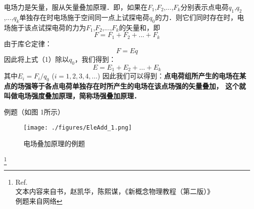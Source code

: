 电场力是矢量，服从矢量叠加原理．即，如果在$F_1$,$F_2$,...,$F_k$分别表示点电荷$q_1$,$q_2$,...,$q_k$单独存在时电场施于空间同一点上试探电荷$q_0$的力．则它们同时存在时，电场施于该点试探电荷的力为$F_1$,$F_2$,...,$F_k$的矢量和，即
\begin{equation}
F = F_1 +F_2 +...+F_k
\end{equation}
由于库仑定律：
\begin{equation}
  F = Eq
\end{equation}
因此将上式（1）除以$q_0$，我们得到： 
\begin{equation}
E = E_1 + E_2 + ... +E_k
\end{equation}
其中$E_i = F_i/q_0$      ($i=1, 2, 3, 4, ...$)
因此我们可以得到：\textbf{点电荷组所产生的电场在某点的场强等于各点电荷单独存在时所产生的电场在该点场强的矢量叠加， 这个就叫做电场强度叠加原理，简称场强叠加原理．}


例题（如图 1所示）
\begin{figure}[ht]
\centering
\texttt{[image: ./figures/EleAdd\_1.png]}
\caption{电场叠加原理的例题} \label{EleAdd_fig1}
\end{figure}

\footnote{Ref.\\ [1]文本内容来自书，赵凯华，陈熙谋，《新概念物理教程（第二版）》\\
               [2]例题来自网络}